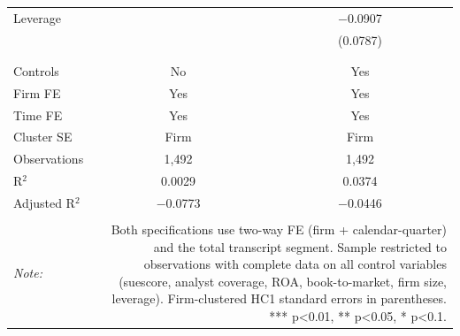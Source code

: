 \begin{table}[!htbp]
\begin{tabular}{@{\extracolsep{5pt}}lcc}
 Leverage &  & $-$0.0907 \\ 
  &  & (0.0787) \\ 
  & & \\ 
\hline \\[-1.8ex] 
Controls & No & Yes \\ 
Firm FE & Yes & Yes \\ 
Time FE & Yes & Yes \\ 
Cluster SE & Firm & Firm \\ 
Observations & 1,492 & 1,492 \\ 
R$^{2}$ & 0.0029 & 0.0374 \\ 
Adjusted R$^{2}$ & $-$0.0773 & $-$0.0446 \\ 
\hline 
\hline \\[-1.8ex] 
\textit{Note:}  & \multicolumn{2}{r}{Both specifications use two-way FE (firm + calendar-quarter) and the total transcript segment. Sample restricted to observations with complete data on all control variables (suescore, analyst coverage, ROA, book-to-market, firm size, leverage). Firm-clustered HC1 standard errors in parentheses. *** p<0.01, ** p<0.05, * p<0.1.} \\ 
\end{tabular} 
\end{table} 

